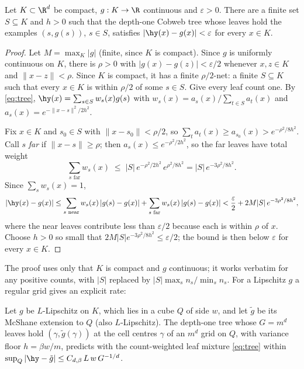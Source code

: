\begin{theorem}\label{thm:univ-tree}
Let $K\subset\R^d$ be compact, $g:K\to\R$ continuous and $\varepsilon>0$.  There are a
finite set $S\subseteq K$ and $h>0$ such that the depth-one Cobweb tree whose leaves hold
the examples $(s,g(s))$, $s\in S$, satisfies $|\hy(x)-g(x)|<\varepsilon$ for every $x\in K$.
\end{theorem}

\begin{proof}
Let $M=\max_K|g|$ (finite, since $K$ is compact).  Since $g$ is uniformly continuous on
$K$, there is $\rho>0$ with $|g(x)-g(z)|<\varepsilon/2$ whenever $x,z\in K$ and
$\|x-z\|<\rho$.  Since $K$ is compact, it has a finite $\rho/2$-net: a finite $S\subseteq K$
such that every $x\in K$ is within $\rho/2$ of some $s\in S$.  Give every leaf count one.
By \eqref{eq:tree}, $\hy(x)=\sum_{s\in S}w_s(x)g(s)$ with
$w_s(x)=a_s(x)/\sum_{t\in S}a_t(x)$ and $a_s(x)=e^{-\|x-s\|^2/2h^2}$.

Fix $x\in K$ and $s_0\in S$ with $\|x-s_0\|<\rho/2$, so $\sum_ta_t(x)\ge a_{s_0}(x)>
e^{-\rho^2/8h^2}$.  Call $s$ \emph{far} if $\|x-s\|\ge\rho$; then $a_s(x)\le e^{-\rho^2/2h^2}$,
so the far leaves have total weight
\[
  \sum_{s\text{ far}}w_s(x)\;\le\;|S|\,e^{-\rho^2/2h^2}\,e^{\rho^2/8h^2}=|S|\,e^{-3\rho^2/8h^2}.
\]
Since $\sum_sw_s(x)=1$,
\[
  |\hy(x)-g(x)|\le\sum_{s\text{ near}}w_s(x)\,|g(s)-g(x)|+\sum_{s\text{ far}}w_s(x)\,|g(s)-g(x)|
  <\frac\varepsilon2+2M|S|\,e^{-3\rho^2/8h^2},
\]
where the near leaves contribute less than $\varepsilon/2$ because each is within $\rho$ of
$x$.  Choose $h>0$ so small that $2M|S|e^{-3\rho^2/8h^2}\le\varepsilon/2$; the bound is then
below $\varepsilon$ for every $x\in K$.
\end{proof}

The proof uses only that $K$ is compact and $g$ continuous; it works verbatim for any
positive counts, with $|S|$ replaced by $|S|\max_sn_s/\min_sn_s$.  For a Lipschitz $g$ a
regular grid gives an explicit rate:

\begin{proposition}\label{prop:rate}
Let $g$ be $L$-Lipschitz on $K$, which lies in a cube $Q$ of side $w$, and let $\tilde g$ be
its McShane extension to $Q$ (also $L$-Lipschitz).  The depth-one tree whose $G=m^d$ leaves
hold $(\gamma,\tilde g(\gamma))$ at the cell centres $\gamma$ of an $m^d$ grid on $Q$, with
variance floor $h=\beta w/m$, predicts with the count-weighted leaf mixture
\eqref{eq:tree} within $\sup_Q|\hy-\tilde g|\le C_{d,\beta}\,L\,w\,G^{-1/d}$.
\end{proposition}

